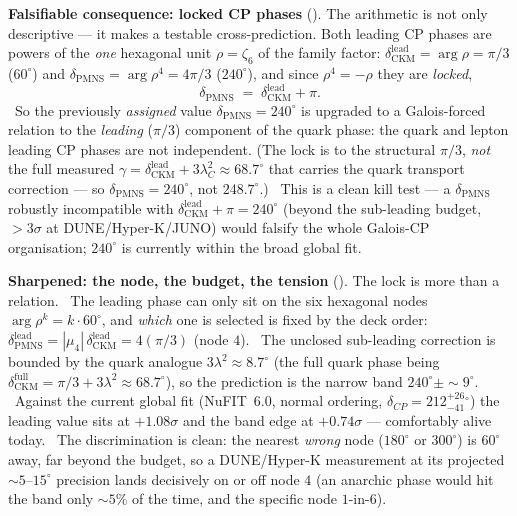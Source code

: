 \par\smallskip\noindent\textbf{Falsifiable consequence: locked CP phases}
(). The arithmetic is not only descriptive --- it makes a testable
cross-prediction. Both leading CP phases are powers of the \emph{one} hexagonal unit $\rho=\zeta_6$ of the family
factor: $\delta_{\mathrm{CKM}}^{\mathrm{lead}}=\arg\rho=\pi/3$ ($60^\circ$) and
$\delta_{\mathrm{PMNS}}=\arg\rho^{4}=4\pi/3$ ($240^\circ$), and since $\rho^4=-\rho$ they are \emph{locked},
\[
  \delta_{\mathrm{PMNS}}\;=\;\delta_{\mathrm{CKM}}^{\mathrm{lead}}+\pi .
\]
\mC\ So the previously \emph{assigned} value $\delta_{\mathrm{PMNS}}=240^\circ$ is upgraded to a Galois-forced
relation to the \emph{leading} ($\pi/3$) component of the quark phase: the quark and lepton leading CP phases are
not independent. (The lock is to the structural $\pi/3$, \emph{not} the full measured
$\gamma=\delta_{\mathrm{CKM}}^{\mathrm{lead}}+3\lambda_C^2\approx68.7^\circ$ that carries the quark transport
correction --- so $\delta_{\mathrm{PMNS}}=240^\circ$, not $248.7^\circ$.) \mX\ This is
a clean kill test --- a $\delta_{\mathrm{PMNS}}$ robustly incompatible with
$\delta_{\mathrm{CKM}}^{\mathrm{lead}}+\pi=240^\circ$ (beyond the sub-leading budget, $>3\sigma$ at
DUNE/Hyper-K/JUNO) would falsify the whole Galois-CP organisation; $240^\circ$ is currently within the broad
global fit.

\par\smallskip\noindent\textbf{Sharpened: the node, the budget, the tension}
(). The lock is more than a relation. \mE\ The leading phase can only sit on the
six hexagonal nodes $\arg\rho^k=k\cdot60^\circ$, and \emph{which} one is selected is fixed by the deck order:
$\delta_{\mathrm{PMNS}}^{\mathrm{lead}}=|\mu_4|\,\delta_{\mathrm{CKM}}^{\mathrm{lead}}=4(\pi/3)$ (node $4$). \mC\ The
unclosed sub-leading correction is bounded by the quark analogue $3\lambda^2\approx8.7^\circ$ (the full quark phase
being $\delta_{\mathrm{CKM}}^{\mathrm{full}}=\pi/3+3\lambda^2\approx68.7^\circ$), so the prediction is the narrow band
$240^\circ\pm\sim9^\circ$. \mC\ Against the current global fit (NuFIT~6.0, normal ordering,
$\delta_{CP}=212^{+26}_{-41}{}^\circ$) the leading value sits at $+1.08\sigma$ and the band edge at $+0.74\sigma$
--- comfortably alive today. \mX\ The discrimination is clean: the nearest \emph{wrong} node ($180^\circ$ or
$300^\circ$) is $60^\circ$ away, far beyond the budget, so a DUNE/Hyper-K measurement at its projected $\sim5$--$15^\circ$
precision lands decisively on or off node $4$ (an anarchic phase would hit the band only $\sim5\%$ of the time, and
the specific node $1$-in-$6$).

